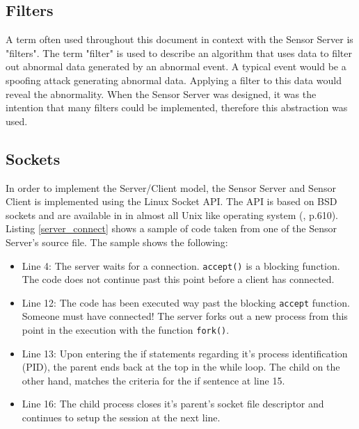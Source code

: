 \documentclass[12pt,english,a4paper]{report}
\begin{document}
\subsection{Filters}\label{filters}
A term often used throughout this document in context with the Sensor Server is "filters". The term "filter" is used to describe an algorithm that uses data to filter out abnormal data generated by an abnormal event. A typical event would be a spoofing attack generating abnormal data. Applying a filter to this data would reveal the abnormality. When the Sensor Server was designed, it was the intention that many filters could be implemented, therefore this abstraction was used.

\subsection{Sockets}\label{sockets}
In order to implement the Server/Client model, the Sensor Server and Sensor Client is implemented using the Linux Socket API. The API is based on BSD sockets and are available in in almost all Unix like operating system (\cite{LINUX_KERNEL}, p.610). Listing \ref{server_connect} shows a sample of code taken from one of the Sensor Server's source file. The sample shows the following:
\begin{itemize}
  \item Line 4: The server waits for a connection. \texttt{accept()} is a blocking function. The code does not continue past this point before a client has connected.  
  \item Line 12: The code has been executed way past the blocking \texttt{accept} function. Someone must have connected! The server forks out a new process from this point in the execution with the function \texttt{fork()}.
  \item Line 13: Upon entering the if statements regarding it's process identification (PID), the parent ends back at the top in the while loop. The child on the other hand, matches the criteria for the if sentence at line 15.
  \item Line 16: The child process closes it's parent's socket file descriptor and continues to setup the session at the next line.
\end{itemize}
\end{document}
